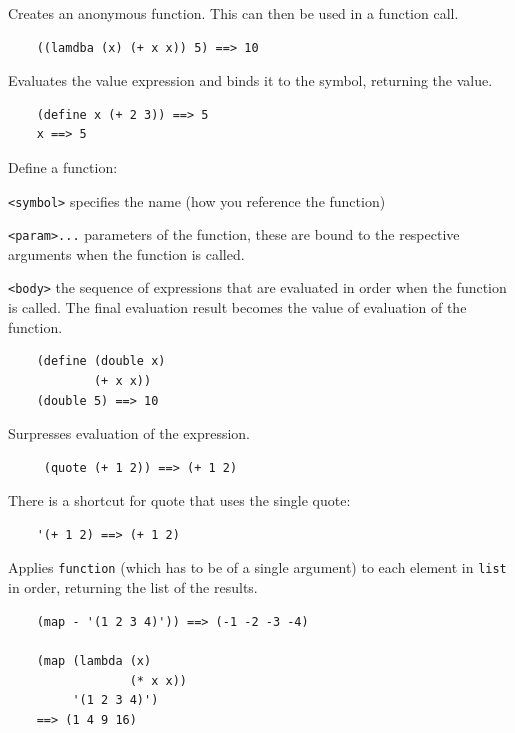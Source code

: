 \documentclass[12pt]{article}
\begin{document}

Creates an anonymous function. This can then be used in a function call.

\begin{verbatim}
    ((lamdba (x) (+ x x)) 5) ==> 10
\end{verbatim}


Evaluates the value expression and binds it to the symbol, returning the value.

\begin{verbatim}
    (define x (+ 2 3)) ==> 5
    x ==> 5
\end{verbatim}


Define a function:

\verb|<symbol>| specifies the name (how you reference the function)

\verb|<param>...| parameters of the function, these are bound to the respective arguments when the function is called.

\verb|<body>| the sequence of expressions that are evaluated in order when the function is called. The final evaluation result becomes the value of evaluation of the function.

\begin{verbatim}
    (define (double x)
            (+ x x))
    (double 5) ==> 10
\end{verbatim}


Surpresses evaluation of the expression.

\begin{verbatim}
     (quote (+ 1 2)) ==> (+ 1 2)
\end{verbatim}

There is a shortcut for quote that uses the single quote:

\begin{verbatim}
    '(+ 1 2) ==> (+ 1 2)
\end{verbatim}


Applies \verb|function| (which has to be of a single argument) to each element in \verb|list| in order, returning the list of the results.

\begin{verbatim}
    (map - '(1 2 3 4)')) ==> (-1 -2 -3 -4)

    (map (lambda (x)
                 (* x x))
         '(1 2 3 4)')
    ==> (1 4 9 16)
\end{verbatim}
\end{document}
